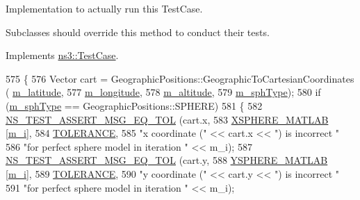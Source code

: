 Implementation to actually run this Test\+Case. 

Subclasses should override this method to conduct their tests. 

Implements \hyperlink{classns3_1_1TestCase_a8ff74680cf017ed42011e4be51917a24}{ns3\+::\+Test\+Case}.


\begin{DoxyCode}
575 \{  
576   Vector cart = GeographicPositions::GeographicToCartesianCoordinates (
      \hyperlink{classGeoToCartesianTestCase_a9902e23dd6ffe03e801cd1be758d978d}{m\_latitude}, 
577                                                                        
      \hyperlink{classGeoToCartesianTestCase_a0b934f42b5af86efff9ad42f01e2e949}{m\_longitude}, 
578                                                                        
      \hyperlink{classGeoToCartesianTestCase_a786ef59877cc3d553ca359d7ddfcaa21}{m\_altitude},
579                                                                        \hyperlink{classGeoToCartesianTestCase_abf771e651f997641307173e08610a7d4}{m\_sphType});
580   \textcolor{keywordflow}{if} (\hyperlink{classGeoToCartesianTestCase_abf771e651f997641307173e08610a7d4}{m\_sphType} == GeographicPositions::SPHERE)
581     \{
582       \hyperlink{group__testing_ga9e7861b56b4e70db3b56044cb7a28e41}{NS\_TEST\_ASSERT\_MSG\_EQ\_TOL} (cart.x, 
583                                  \hyperlink{geo-to-cartesian-test_8cc_aa5e69989c0e923f1c732094071ddff95}{XSPHERE\_MATLAB} [\hyperlink{classGeoToCartesianTestCase_aeeb6a9cb21dad88d5ea4d939bf444f95}{m\_i}], 
584                                  \hyperlink{geo-to-cartesian-test_8cc_a89311a98397f9d6967d2cb10d5152d77}{TOLERANCE}, 
585                                  \textcolor{stringliteral}{"x coordinate ("} << cart.x << \textcolor{stringliteral}{") is incorrect "}
586                                  \textcolor{stringliteral}{"for perfect sphere model in iteration "} << m\_i);
587       \hyperlink{group__testing_ga9e7861b56b4e70db3b56044cb7a28e41}{NS\_TEST\_ASSERT\_MSG\_EQ\_TOL} (cart.y, 
588                                  \hyperlink{geo-to-cartesian-test_8cc_a9d86d14dc9fe56ade53f8b891bc292eb}{YSPHERE\_MATLAB} [\hyperlink{classGeoToCartesianTestCase_aeeb6a9cb21dad88d5ea4d939bf444f95}{m\_i}], 
589                                  \hyperlink{geo-to-cartesian-test_8cc_a89311a98397f9d6967d2cb10d5152d77}{TOLERANCE}, 
590                                  \textcolor{stringliteral}{"y coordinate ("} << cart.y << \textcolor{stringliteral}{") is incorrect "}
591                                  \textcolor{stringliteral}{"for perfect sphere model in iteration "} << m\_i);

\end{DoxyCode}
